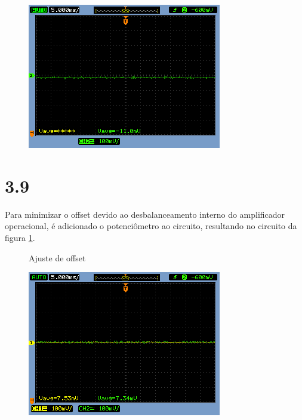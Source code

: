 \documentclass[brazil]{article}
\begin{document}
\begin{figure}[H]
\begin{centering}
\includegraphics[scale=0.5]{figuras/382cres}
\par\end{centering}

\caption{}

\end{figure}


\section*{3.9}

Para minimizar o offset devido ao desbalanceamento interno do amplificador operacional, é adicionado o potenciômetro ao circuito, resultando no circuito da figura \ref{circ:5}.

\vspace{3mm}
\begin{figure}[h!]
\centerline{}
\caption{Ajuste de offset \label{circ:5}}
\end{figure}

\begin{figure}[H]
\begin{centering}
\includegraphics[scale=0.5]{figuras/39}
\par\end{centering}
\caption{}
\end{figure}
\end{document}
